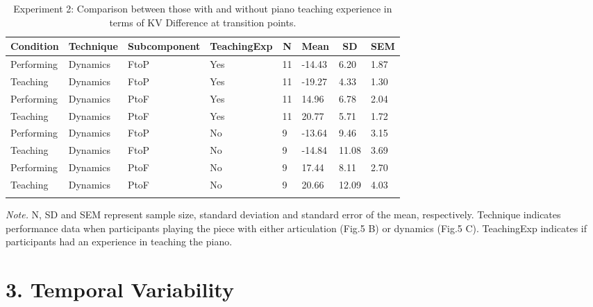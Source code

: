\documentclass[
  man,floatsintext]{apa6}
\begin{document}
\begin{table}[tbp]

\begin{center}
\begin{threeparttable}

\caption{\label{tab:dyn-diff-teaching-desc-2}Experiment 2: Comparison between those with and without piano teaching experience in terms of KV Difference at transition points.}

\begin{tabular}{llllllll}
\toprule
Condition & \multicolumn{1}{c}{Technique} & \multicolumn{1}{c}{Subcomponent} & \multicolumn{1}{c}{TeachingExp} & \multicolumn{1}{c}{N} & \multicolumn{1}{c}{Mean} & \multicolumn{1}{c}{SD} & \multicolumn{1}{c}{SEM}\\
\midrule
Performing & Dynamics & FtoP & Yes & 11 & -14.43 & 6.20 & 1.87\\
Teaching & Dynamics & FtoP & Yes & 11 & -19.27 & 4.33 & 1.30\\
Performing & Dynamics & PtoF & Yes & 11 & 14.96 & 6.78 & 2.04\\
Teaching & Dynamics & PtoF & Yes & 11 & 20.77 & 5.71 & 1.72\\
Performing & Dynamics & FtoP & No & 9 & -13.64 & 9.46 & 3.15\\
Teaching & Dynamics & FtoP & No & 9 & -14.84 & 11.08 & 3.69\\
Performing & Dynamics & PtoF & No & 9 & 17.44 & 8.11 & 2.70\\
Teaching & Dynamics & PtoF & No & 9 & 20.66 & 12.09 & 4.03\\
\bottomrule
\addlinespace
\end{tabular}

\begin{tablenotes}[para]
\normalsize{\textit{Note.} N, SD and SEM represent sample size, standard deviation and standard error of the mean, respectively. Technique indicates performance data when participants playing the piece with either articulation (Fig.5 B) or dynamics (Fig.5 C). TeachingExp indicates if participants had an experience in teaching the piano.}
\end{tablenotes}

\end{threeparttable}
\end{center}

\end{table}

\clearpage

\hypertarget{temporal-variability}{%
\section{3. Temporal Variability}\label{temporal-variability}}
\end{document}
